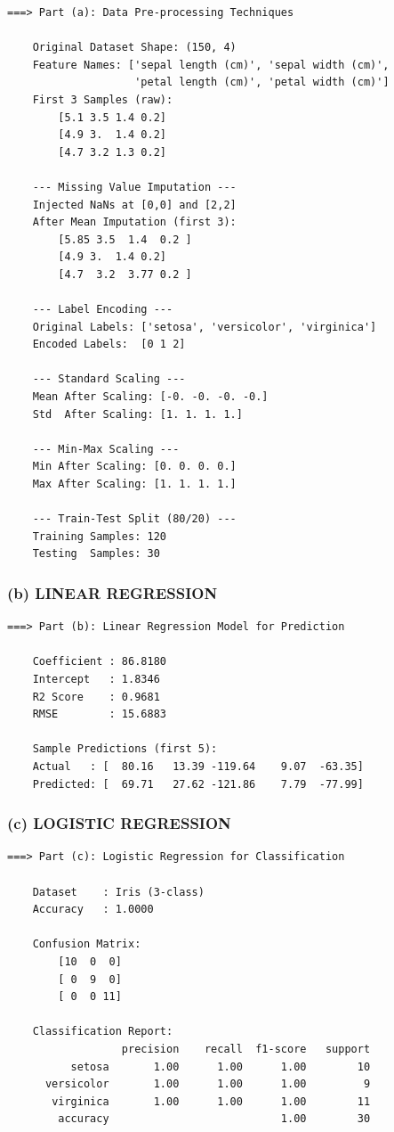 \documentclass[12pt,a4paper]{article}
\begin{document}
\begin{lstlisting}[style=outputstyle]
===> Part (a): Data Pre-processing Techniques

    Original Dataset Shape: (150, 4)
    Feature Names: ['sepal length (cm)', 'sepal width (cm)',
                    'petal length (cm)', 'petal width (cm)']
    First 3 Samples (raw):
        [5.1 3.5 1.4 0.2]
        [4.9 3.  1.4 0.2]
        [4.7 3.2 1.3 0.2]

    --- Missing Value Imputation ---
    Injected NaNs at [0,0] and [2,2]
    After Mean Imputation (first 3):
        [5.85 3.5  1.4  0.2 ]
        [4.9 3.  1.4 0.2]
        [4.7  3.2  3.77 0.2 ]

    --- Label Encoding ---
    Original Labels: ['setosa', 'versicolor', 'virginica']
    Encoded Labels:  [0 1 2]

    --- Standard Scaling ---
    Mean After Scaling: [-0. -0. -0. -0.]
    Std  After Scaling: [1. 1. 1. 1.]

    --- Min-Max Scaling ---
    Min After Scaling: [0. 0. 0. 0.]
    Max After Scaling: [1. 1. 1. 1.]

    --- Train-Test Split (80/20) ---
    Training Samples: 120
    Testing  Samples: 30
\end{lstlisting}

\subsubsection*{(b) LINEAR REGRESSION}

\begin{lstlisting}[style=outputstyle]
===> Part (b): Linear Regression Model for Prediction

    Coefficient : 86.8180
    Intercept   : 1.8346
    R2 Score    : 0.9681
    RMSE        : 15.6883

    Sample Predictions (first 5):
    Actual   : [  80.16   13.39 -119.64    9.07  -63.35]
    Predicted: [  69.71   27.62 -121.86    7.79  -77.99]
\end{lstlisting}

\subsubsection*{(c) LOGISTIC REGRESSION}

\begin{lstlisting}[style=outputstyle]
===> Part (c): Logistic Regression for Classification

    Dataset    : Iris (3-class)
    Accuracy   : 1.0000

    Confusion Matrix:
        [10  0  0]
        [ 0  9  0]
        [ 0  0 11]

    Classification Report:
                  precision    recall  f1-score   support
          setosa       1.00      1.00      1.00        10
      versicolor       1.00      1.00      1.00         9
       virginica       1.00      1.00      1.00        11
        accuracy                           1.00        30
\end{lstlisting}
\end{document}
